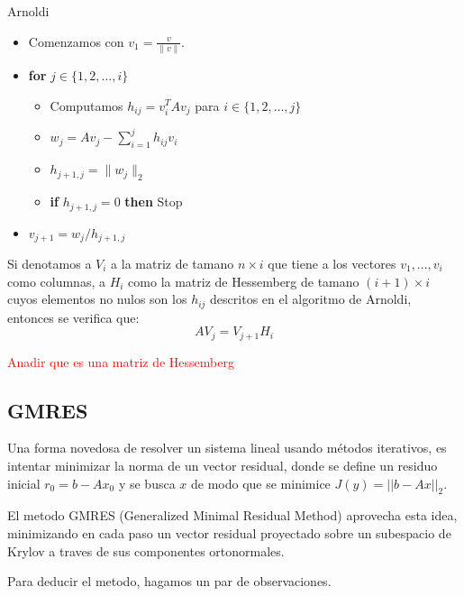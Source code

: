 \documentclass[12pt, oneside]{book}
\begin{document}
	\begin{algorithm}
		\caption{Arnoldi}
		\begin{itemize}
			\item Comenzamos con $v_1 = \frac{v}{\|v\|}$.
			\item \textbf{for} $j \in \{1, 2, \dots, i\}$
			\begin{itemize}
				\item Computamos $h_{ij} = v_i^TAv_j$ para $i \in \{1, 2, \dots, j\}$
				\item $w_j = Av_j - \sum_{i=1}^j h_{ij} v_i$
				\item $h_{j+1,j} = \|w_j\|_2$
				\item \textbf{if} $h_{j+1,j} = 0$ \textbf{then} Stop
			\end{itemize}
			\item $v_{j+1} = w_j / h_{j+1,j}$
		\end{itemize}
	\end{algorithm}
	
	Si denotamos a $V_i$ a la matriz de tamano $n\times i$ que tiene a los vectores $v_1, ..., v_i$ como columnas, a $H_i$ como la matriz de Hessemberg de tamano $(i+1)\times i$ cuyos elementos no nulos son los $h_{ij}$ descritos en el algoritmo de Arnoldi, entonces se verifica que: $$AV_j=V_{j+1}H_i$$
	
	\textcolor{red}{Anadir que es una matriz de Hessemberg}
	
\subsection{GMRES}
	Una forma novedosa de resolver un sistema lineal usando métodos iterativos, es intentar minimizar la norma de un vector residual, donde se define un residuo inicial $r_0=b-Ax_0$ y se busca $x$ de modo que se minimice $J(y)=||b-Ax||_2$.
	
	El metodo GMRES (Generalized Minimal Residual Method) aprovecha esta idea, minimizando en cada paso un vector residual proyectado sobre un subespacio de Krylov a traves de sus componentes ortonormales. 
	
	Para deducir el metodo, hagamos un par de observaciones.
	
\end{document}
